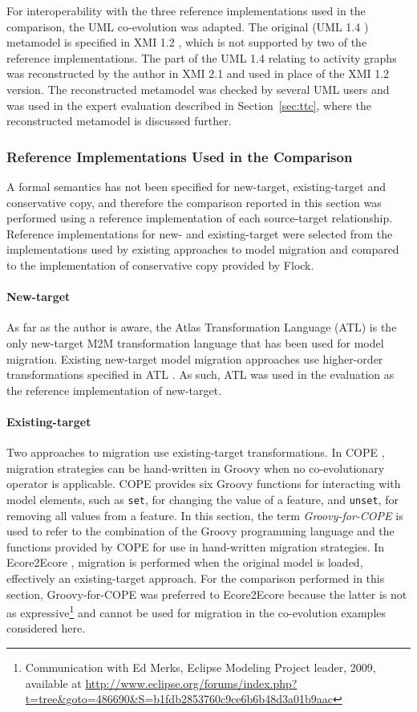 For interoperability with the three reference implementations used in the comparison, the UML co-evolution was adapted. The original (UML 1.4 \cite{uml14}) metamodel is specified in XMI 1.2 \cite{xmi}, which is not supported by two of the reference implementations. The part of the UML 1.4 relating to activity graphs was reconstructed by the author in XMI 2.1 and used in place of the XMI 1.2 version. The reconstructed metamodel was checked by several UML users and was used in the expert evaluation described in Section~\ref{sec:ttc}, where the reconstructed metamodel is discussed further. 

\subsubsection{Reference Implementations Used in the Comparison}
A formal semantics has not been specified for new-target, existing-target and conservative copy, and therefore the comparison reported in this section was performed using a reference implementation of each source-target relationship. Reference implementations for new- and existing-target were selected from the implementations used by existing approaches to model migration and compared to the implementation of conservative copy provided by Flock.

\paragraph{New-target} As far as the author is aware, the Atlas Transformation Language (ATL) is the only new-target M2M transformation language that has been used for model migration. Existing new-target model migration approaches use higher-order transformations specified in ATL \cite{cicchetti08automating,garces09managing}. As such, ATL was used in the evaluation as the reference implementation of new-target.

\paragraph{Existing-target} Two approaches to migration use existing-target transformations. In COPE \cite{herrmannsdoerfer09cope}, migration strategies can be hand-written in Groovy when no co-evolutionary operator is applicable. COPE provides six Groovy functions for interacting with model elements, such as \texttt{set}, for changing the value of a feature, and \texttt{unset}, for removing all values from a feature. In this section, the term \emph{Groovy-for-COPE} is used to refer to the combination of the Groovy programming language and the functions provided by COPE for use in hand-written migration strategies. In Ecore2Ecore \cite{hussey06advanced}, migration is performed when the original model is loaded, effectively an existing-target approach. For the comparison performed in this section, Groovy-for-COPE was preferred to Ecore2Ecore because the latter is not as expressive\footnote{Communication with Ed Merks, Eclipse Modeling Project leader, 2009, available at \url{http://www.eclipse.org/forums/index.php?t=tree&goto=486690&S=b1fdb2853760c9ce6b6b48d3a01b9aac}} and cannot be used for migration in the co-evolution examples considered here.

